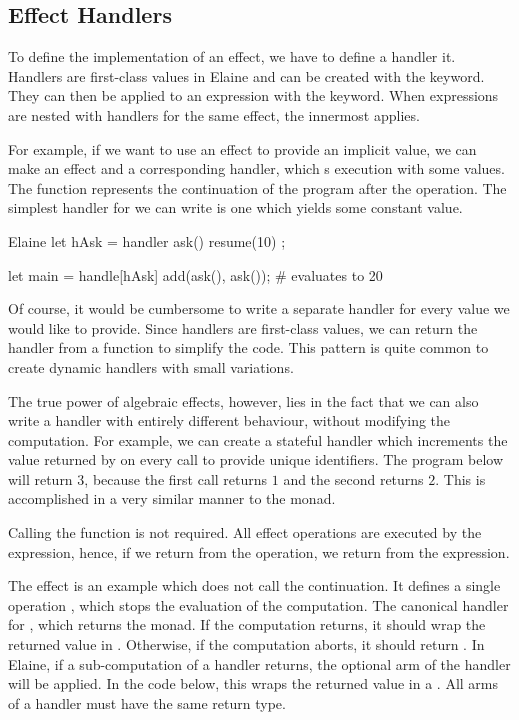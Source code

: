 \subsection{Effect Handlers}\label{sec:alghandlers}

To define the implementation of an effect, we have to define a handler it. Handlers are first-class values in Elaine and can be created with the  keyword. They can then be applied to an expression with the  keyword. When  expressions are nested with handlers for the same effect, the innermost  applies.

For example, if we want to use an effect to provide an implicit value, we can make an effect  and a corresponding handler, which s execution with some values. The  function represents the continuation of the program after the operation. The simplest handler for  we can write is one which yields some constant value.

\begin{lst}{Elaine}
let hAsk = handler { ask() { resume(10) } };

let main = handle[hAsk] add(ask(), ask()); # evaluates to 20
\end{lst}
%
Of course, it would be cumbersome to write a separate handler for every value we would like to provide. Since handlers are first-class values, we can return the handler from a function to simplify the code. This pattern is quite common to create dynamic handlers with small variations.


The true power of algebraic effects, however, lies in the fact that we can also write a handler with entirely different behaviour, without modifying the computation. For example, we can create a stateful handler which increments the value returned by  on every call to provide unique identifiers. The program below will return $3$, because the first  call returns $1$ and the second returns $2$. This is accomplished in a very similar manner to the  monad.


Calling the  function is not required. All effect operations are executed by the  expression, hence, if we return from the operation, we return from the  expression.

The  effect is an example which does not call the continuation. It defines a single operation , which stops the evaluation of the computation. The canonical handler for , which returns the  monad. If the computation returns, it should wrap the returned value in . Otherwise, if the computation aborts, it should return . In Elaine, if a sub-computation of a handler returns, the optional  arm of the handler will be applied. In the code below, this wraps the returned value in a . All arms of a handler must have the same return type.


